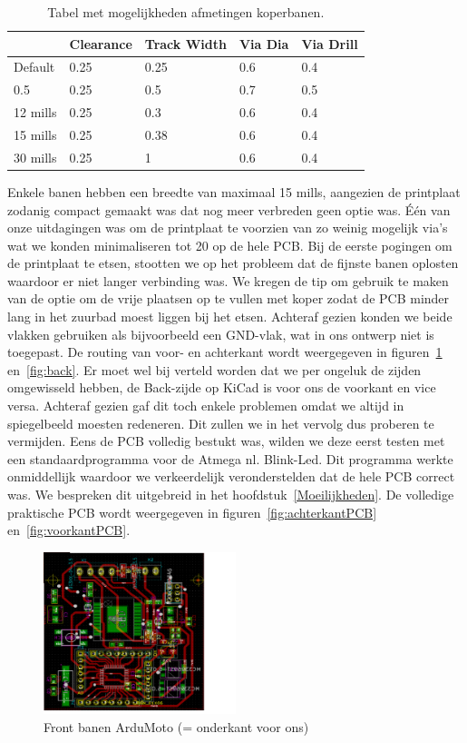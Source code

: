 \begin {table}[H]
\caption {Tabel met mogelijkheden afmetingen koperbanen.} \label{table:afmetingen}
	\begin{center}
	\begin{tabular}{ | l | l | l | l | l |}
	\hline
	  & Clearance & Track Width & Via Dia & Via Drill\\ \hline
	Default & 0.25 & 0.25 & 0.6 & 0.4\\ \hline
	0.5 & 0.25 & 0.5 & 0.7 & 0.5 \\ \hline
	12 mills & 0.25 & 0.3 & 0.6 & 0.4 \\ \hline
	15 mills & 0.25 & 0.38 & 0.6 & 0.4 \\ \hline
	30 mills & 0.25 & 1 & 0.6 & 0.4 \\ \hline
	\end{tabular}
	\end{center}
\end{table}
 Enkele banen hebben een breedte van maximaal 15 mills, aangezien de printplaat zodanig compact gemaakt was dat nog meer verbreden geen optie was. \'E\'en van onze uitdagingen was om de printplaat te voorzien van zo weinig mogelijk via's wat we konden minimaliseren tot 20 op de hele PCB. Bij de  eerste pogingen om de printplaat te etsen, stootten we op het probleem dat de fijnste banen oplosten waardoor er niet langer verbinding was. We kregen de tip om gebruik te maken van de optie om de vrije plaatsen op te vullen met koper zodat de PCB minder lang in het zuurbad moest liggen bij het etsen. Achteraf gezien konden we beide vlakken gebruiken als bijvoorbeeld een GND-vlak, wat in ons ontwerp niet is toegepast. De routing van voor- en achterkant wordt weergegeven in figuren~\ref{fig:front} en~\ref{fig:back}. Er moet wel bij verteld worden dat we per ongeluk de zijden omgewisseld hebben, de Back-zijde op KiCad is voor ons de voorkant en vice versa. Achteraf gezien gaf dit toch enkele problemen omdat we altijd in spiegelbeeld moesten redeneren. Dit zullen we in het vervolg dus proberen te vermijden. Eens de PCB volledig bestukt was, wilden we deze eerst testen met een standaardprogramma voor de Atmega nl. Blink-Led. Dit programma werkte onmiddellijk waardoor we verkeerdelijk veronderstelden dat de hele PCB correct was. We bespreken dit uitgebreid in het hoofdstuk~\ref{Moeilijkheden}. De volledige praktische PCB wordt weergegeven in figuren~\ref{fig:achterkantPCB} en~\ref{fig:voorkantPCB}. 
\begin{figure}[h]
\centering
\includegraphics[width=0.5\textwidth]{Front.png}
\caption{Front banen ArduMoto (= onderkant voor ons)}
\label{fig:front}
\end{figure}

